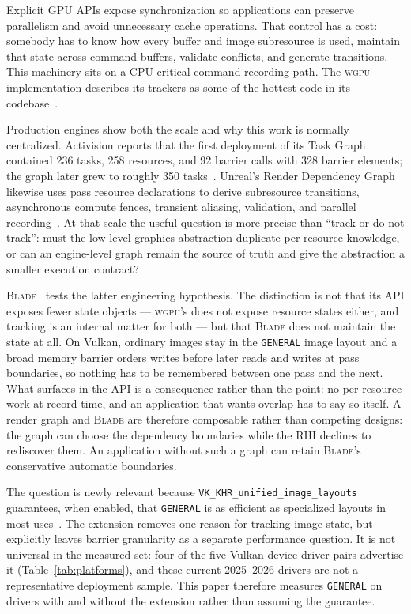 \documentclass[10pt,twocolumn]{article}
\newcommand{\blade}{\textsc{Blade}}
\newcommand{\wgpu}{\textsc{wgpu}}
\begin{document}
Explicit GPU APIs expose synchronization so applications can preserve
parallelism and avoid unnecessary cache operations. That control has a cost:
somebody has to know how every buffer and image subresource is used, maintain
that state across command buffers, validate conflicts, and generate
transitions. This machinery sits on a CPU-critical command recording path. The
\wgpu{} implementation describes its trackers as some of the hottest code in
its codebase~\cite{wgpu-trackers}.

Production engines show both the scale and why this work is normally
centralized. Activision reports that the first deployment of its Task Graph
contained 236 tasks, 258 resources, and 92 barrier calls with 328 barrier
elements; the graph later grew to roughly 350 tasks~\cite{activision-task-graph}.
Unreal's Render Dependency Graph likewise uses
pass resource declarations to derive subresource transitions, asynchronous
compute fences, transient aliasing, validation, and parallel
recording~\cite{unreal-rdg}. At that scale the useful question is more precise than
``track or do not track'': must the low-level graphics abstraction duplicate
per-resource knowledge, or can an engine-level graph remain the source of
truth and give the abstraction a smaller execution contract?

\blade{}~\cite{blade} tests the latter engineering hypothesis. The
distinction is not that its API exposes fewer state objects --- \wgpu's does
not expose resource states either, and tracking is an internal matter for both
--- but that \blade{} does not maintain the state at all. On Vulkan, ordinary
images stay in the \texttt{GENERAL} image layout and a broad memory barrier
orders writes before later reads and writes at pass boundaries, so nothing has
to be remembered between one pass and the next. What surfaces in the API is a
consequence rather than the point: no per-resource work at record time, and an
application that wants overlap has to say so itself. A render graph and
\blade{} are therefore composable rather than competing designs: the graph can
choose the dependency boundaries while the RHI declines to rediscover them.
An application without such a graph can retain \blade's conservative automatic
boundaries.

The question is newly relevant because
\texttt{VK\_KHR\_unified\_image\_layouts} guarantees, when enabled, that
\texttt{GENERAL} is as efficient as specialized layouts in most
uses~\cite{vulkan-unified-layouts}. The extension removes one reason for
tracking image state, but explicitly leaves barrier granularity as a separate
performance question. It is not universal in the measured set: four of the
five Vulkan device-driver pairs advertise it (Table~\ref{tab:platforms}), and
these current 2025--2026 drivers are not a representative deployment sample.
This paper therefore measures \texttt{GENERAL} on drivers with and without the
extension rather than assuming the guarantee.
\end{document}
